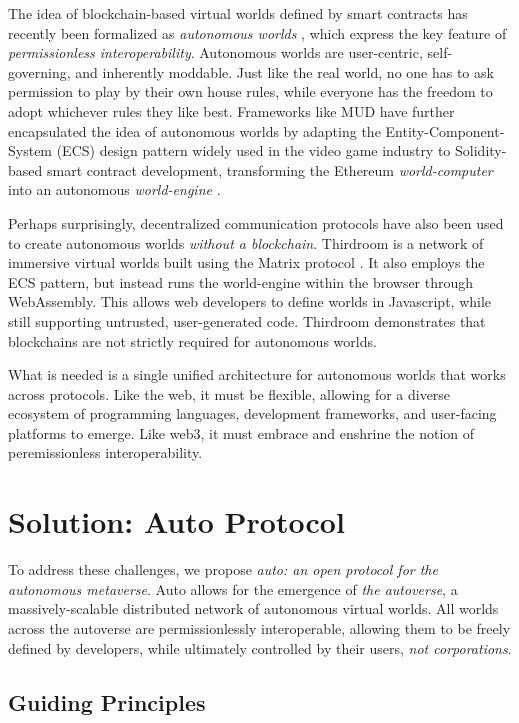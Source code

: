 \documentclass[twocolumn, 10pt]{article}
\begin{document}
The idea of blockchain-based virtual worlds defined by smart contracts has recently been formalized as \textit{autonomous worlds} \cite{AutonomousWorlds}, which express the key feature of \textit{permissionless interoperability}. Autonomous worlds are user-centric, self-governing, and inherently moddable. Just like the real world, no one has to ask permission to play by their own house rules, while everyone has the freedom to adopt whichever rules they like best. Frameworks like MUD have further encapsulated the idea of autonomous worlds by adapting the Entity-Component-System (ECS) design pattern widely used in the video game industry to Solidity-based smart contract development, transforming the Ethereum \textit{world-computer} into an autonomous \textit{world-engine} \cite{MUD}.

Perhaps surprisingly, decentralized communication protocols have also been used to create autonomous worlds \textit{without a blockchain}. Thirdroom is a network of immersive virtual worlds built using the Matrix protocol \cite{ThirdRoom}. It also employs the ECS pattern, but instead runs the world-engine within the browser through WebAssembly. This allows web developers to define worlds in Javascript, while still supporting untrusted, user-generated code. Thirdroom demonstrates that blockchains are not strictly required for autonomous worlds.

What is needed is a single unified architecture for autonomous worlds that works across protocols. Like the web, it must be flexible, allowing for a diverse ecosystem of programming languages, development frameworks, and user-facing platforms to emerge. Like web3, it must embrace and enshrine the notion of peremissionless interoperability. 

\section{Solution: Auto Protocol}
To address these challenges, we propose \textit{auto: an open protocol for the autonomous metaverse}. Auto allows for the emergence of \textit{the autoverse}, a massively-scalable distributed network of autonomous virtual worlds. All worlds across the autoverse are permissionlessly interoperable, allowing them to be freely defined by developers, while ultimately controlled by their users, \textit{not corporations}. 

\subsection{Guiding Principles}
\end{document}
